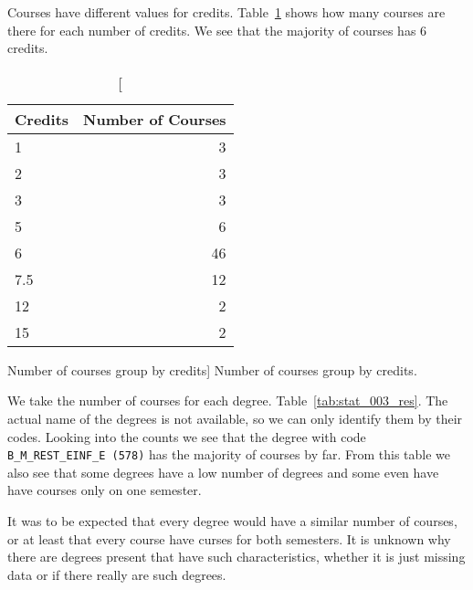 Courses have different values for credits. Table~\ref{tab:courses_credits}
shows how many courses are there for each number of credits. We see that the
majority of courses has 6 credits.

\begin{table}[h!]
    \centering

    \begin{tabular}{| l | r |}
        \hline
        Credits & Number of Courses \\ \hline
        1       & 3                 \\ \hline
        2       & 3                 \\ \hline
        3       & 3                 \\ \hline
        5       & 6                 \\ \hline
        6       & 46                \\ \hline
        7.5     & 12                \\ \hline
        12      & 2                 \\ \hline
        15      & 2                 \\ \hline
    \end{tabular}

    \caption
        [Number of courses group by credits]
        {Number of courses group by credits.}

    \label{tab:courses_credits}
\end{table}

We take the number of courses for each degree. Table~\ref{tab:stat_003_res}.
The actual name of the degrees is not available, so we can only identify them
by their codes. Looking into the counts we see that the degree with code
\texttt{B\_M\_REST\_EINF\_E (578)} has the majority of courses by far. From
this table we also see that some degrees have a low number of degrees and some
even have have courses only on one semester.

It was to be expected that every degree would have a similar number of courses,
or at least that every course have curses for both semesters. It is unknown why
there are degrees present that have such characteristics, whether it is just
missing data or if there really are such degrees.

